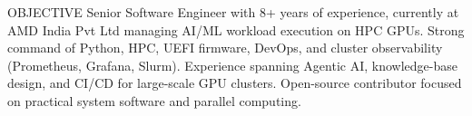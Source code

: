 \documentclass{resume} %
\begin{document}
\def\profile{0}


\begin{rSection}{OBJECTIVE}
{Senior Software Engineer with 8+ years of experience, currently at AMD India Pvt Ltd managing AI/ML workload execution on HPC GPUs. Strong command of Python, HPC, UEFI firmware, DevOps, and cluster observability (Prometheus, Grafana, Slurm). Experience spanning Agentic AI, knowledge-base design, and CI/CD for large-scale GPU clusters. Open-source contributor focused on practical system software and parallel computing.}

\end{rSection}




\end{document}

